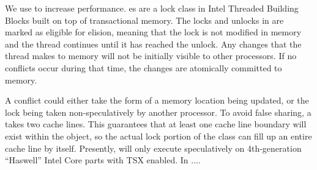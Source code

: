 
We use  to increase performance.
es are a lock class in Intel Threaded Building
Blocks built on top of transactional memory. The locks and unlocks in
 are marked as eligible for elision, meaning that
the lock is not modified in memory and the thread continues until it has
reached the unlock. Any changes that the thread makes to memory will not be
initially visible to other processors. If no conflicts occur during that time,
the changes are atomically committed to memory.

A conflict could either take the form of a memory location being updated, or
the lock being taken non-speculatively by another processor. To avoid false
sharing, a  takes two cache lines. This
guarantees that at least one cache line boundary will exist within the object,
so the actual lock portion of the class can fill up an entire cache line by
itself. Presently,  will only execute
speculatively on 4th-generation ``Haswell'' Intel Core parts with TSX enabled.
In ....
